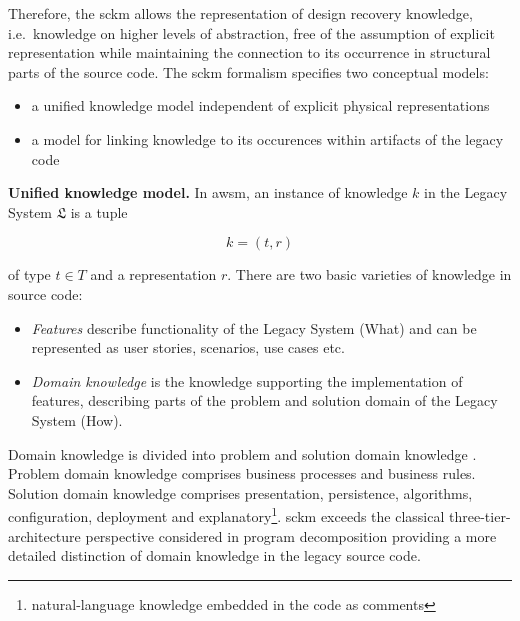 Therefore, the \gls{sckm} allows the representation of design recovery knowledge, i.e.~knowledge on higher levels of abstraction, free of the assumption of explicit representation while maintaining the connection to its occurrence in structural parts of the source code.
The \gls{sckm} formalism specifies two conceptual models:
\begin{itemize}
\item a unified knowledge model independent of explicit physical representations
\item a model for linking knowledge to its occurences within artifacts of the legacy code
\end{itemize}

\textbf{Unified knowledge model.} In \gls{awsm}, an instance of knowledge \(k\) in the \gls{Legacy System} \(\mathfrak{L}\) is a tuple

\begin{equation}k = (t, r)\label{eq:knowledge}\end{equation}

of type \(t \in T\) and a representation \(r\).
%
There are two basic varieties of knowledge in  source code:
\begin{itemize}
\item \emph{Features} describe functionality of the \gls{Legacy System} (What) and can be represented as user stories, scenarios, use cases etc.
\item \emph{Domain knowledge} is the knowledge supporting the implementation of features, describing parts of the problem and solution domain of the \gls{Legacy System} (How).
\end{itemize}
Domain knowledge is divided into problem and solution domain knowledge \autocite{Marcus2004ProblemLocation}.
Problem domain knowledge comprises business processes and business rules.
Solution domain knowledge comprises presentation, persistence, algorithms, configuration, deployment and explanatory\footnote{natural-language knowledge embedded in the code as comments}.
\gls{sckm} exceeds the classical three-tier-architecture perspective considered in program decomposition providing a more detailed distinction of domain knowledge in the legacy source code.

